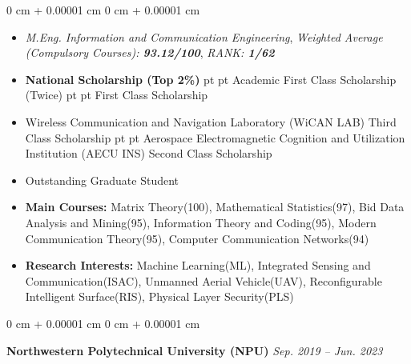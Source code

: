 \documentclass[10pt, letterpaper]{article}
\newenvironment{highlights}{
    \begin{itemize}[
        topsep=0.10 cm,
        parsep=0.10 cm,
        partopsep=0pt,
        itemsep=0pt,
        leftmargin=0 cm + 10pt
    ]
}{
    \end{itemize}
} %
\newenvironment{onecolentry}{
    \begin{adjustwidth}{
        0 cm + 0.00001 cm
    }{
        0 cm + 0.00001 cm
    }
}{
    \end{adjustwidth}
} %
\newenvironment{twocolentry}[2][]{
    \onecolentry
    \def\secondColumn{#2}
    \setcolumnwidth{\fill, 4.5 cm}
    \begin{paracol}{2}
}{
    \switchcolumn \raggedleft \secondColumn
    \end{paracol}
    \endonecolentry
} %
\begin{document}
        \vspace{0.10 cm}
        \begin{onecolentry}
            \begin{highlights}
				\item \textit{M.Eng. Information and Communication Engineering}, \textit{Weighted Average (Compulsory Courses): \textbf{\textit{93.12/100}}}, \textit{RANK: \textbf{\textit{1/62}}}
                \item \textbf{National Scholarship (Top 2\%)} pt \AND {} pt Academic First Class Scholarship (Twice) pt \AND {} pt First Class Scholarship
                \item Wireless Communication and Navigation Laboratory (WiCAN LAB) Third Class Scholarship pt \AND {} pt Aerospace Electromagnetic Cognition and Utilization Institution (AECU INS) Second Class Scholarship
                \item Outstanding Graduate Student
                \item \textbf{Main Courses:} Matrix Theory(100), Mathematical Statistics(97), Bid Data Analysis and Mining(95), Information Theory and Coding(95), Modern Communication Theory(95), Computer Communication Networks(94)
                \item \textbf{Research Interests:} Machine Learning(ML), Integrated Sensing and Communication(ISAC), Unmanned Aerial Vehicle(UAV), Reconfigurable Intelligent Surface(RIS),  Physical Layer Security(PLS)
            \end{highlights}
        \end{onecolentry}
        
        \vspace{0.20 cm}
        \begin{twocolentry}{
            \textit{Sep. 2019 – Jun. 2023}
        }
            \textbf{Northwestern Polytechnical University (NPU)}\end{twocolentry}
\end{document}
